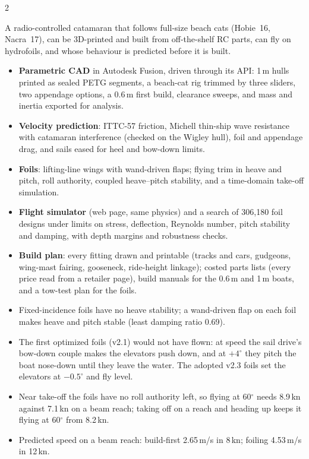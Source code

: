 \documentclass[10pt]{article}
\newcommand{\head}[1]{\vspace{5pt}{\color{navy}\large\bfseries #1}\par\vspace{2pt}}
\begin{document}
\begin{multicols}{2}
\head{Goal}
A radio-controlled catamaran that follows full-size beach cats (Hobie~16, Nacra~17), can be 3D-printed and built from off-the-shelf RC parts, can fly on hydrofoils, and whose behaviour is predicted before it is built.

\head{What was done}
\begin{itemize}
\item \textbf{Parametric CAD} in Autodesk Fusion, driven through its API: 1\,m hulls printed as sealed PETG segments, a beach-cat rig trimmed by three sliders, two appendage options, a 0.6\,m first build, clearance sweeps, and mass and inertia exported for analysis.
\item \textbf{Velocity prediction}: ITTC-57 friction, Michell thin-ship wave resistance with catamaran interference (checked on the Wigley hull), foil and appendage drag, and sails eased for heel and bow-down limits.
\item \textbf{Foils}: lifting-line wings with wand-driven flaps; flying trim in heave and pitch, roll authority, coupled heave--pitch stability, and a time-domain take-off simulation.
\item \textbf{Flight simulator} (web page, same physics) and a search of 306,180 foil designs under limits on stress, deflection, Reynolds number, pitch stability and damping, with depth margins and robustness checks.
\item \textbf{Build plan}: every fitting drawn and printable (tracks and cars, gudgeons, wing-mast fairing, gooseneck, ride-height linkage); costed parts lists (every price read from a retailer page), build manuals for the 0.6\,m and 1\,m boats, and a tow-test plan for the foils.
\end{itemize}

\head{Findings}
\begin{itemize}
\item Fixed-incidence foils have no heave stability; a wand-driven flap on each foil makes heave and pitch stable (least damping ratio 0.69).
\item The first optimized foils (v2.1) would not have flown: at speed the sail drive's bow-down couple makes the elevators push down, and at $+4^\circ$ they pitch the boat nose-down until they leave the water. The adopted v2.3 foils set the elevators at $-0.5^\circ$ and fly level.
\item Near take-off the foils have no roll authority left, so flying at 60$^\circ$ needs 8.9\,kn against 7.1\,kn on a beam reach; taking off on a reach and heading up keeps it flying at 60$^\circ$ from 8.2\,kn.
\item Predicted speed on a beam reach: build-first 2.65\,m/s in 8\,kn; foiling 4.53\,m/s in 12\,kn.
\end{itemize}


\end{multicols}
\end{document}
